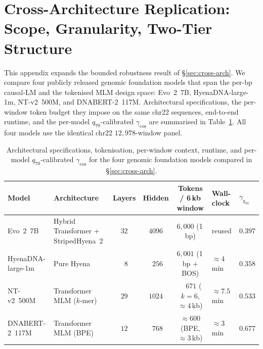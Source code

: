 \documentclass{article}
\theoremstyle{plain}
\theoremstyle{definition}
\theoremstyle{remark}
\begin{document}
\section{Cross-Architecture Replication: Scope, Granularity, Two-Tier Structure}
\label{app:cross-arch}

This appendix expands the bounded robustness result of
\S\ref{sec:cross-arch}. We compare four publicly released genomic
foundation models that span the per-bp causal-LM and the tokenised MLM
design space: Evo~2~7B, HyenaDNA-large-1m, NT-v2~500M, and
DNABERT-2~117M. Architectural specifications, the per-window token budget
they impose on the same chr22 sequences, end-to-end runtime, and the
per-model $q_{70}$-calibrated $\gamma_{\cos}$ are summarised in
Table~\ref{tab:fm-specs}. All four models use the identical chr22
$12{,}978$-window panel.

\begin{table}[!htbp]
  \caption{Architectural specifications, tokenisation, per-window context,
    runtime, and per-model $q_{70}$-calibrated $\gamma_{\cos}$ for the four
  genomic foundation models compared in \S\ref{sec:cross-arch}.}
  \label{tab:fm-specs}
  \centering
  \footnotesize
  \setlength{\tabcolsep}{4pt}
  \begin{tabular}{@{}llcccll@{}}
    \toprule
    Model & Architecture & Layers & Hidden & Tokens / 6\,kb window
    & Wall-clock & $\gamma_{q_{70}}$ \\
    \midrule
    Evo~2~7B          & Hybrid Transformer + StripedHyena~2 & $32$ & $4096$
    & $6{,}000$ (1\,bp)         & reused      & $0.397$ \\
    HyenaDNA-large-1m & Pure Hyena                          & $\phantom{0}8$ & $\phantom{0}256$
    & $6{,}001$ (1\,bp + BOS)   & $\approx 4$\,min    & $0.358$ \\
    NT-v2~500M        & Transformer MLM ($k$-mer)           & $29$ & $1024$
    & $\phantom{0,}671$ ($k=6$, $\approx 4$\,kb) & $\approx 7.5$\,min  & $0.533$ \\
    DNABERT-2~117M    & Transformer MLM (BPE)               & $12$ & $\phantom{0}768$
    & $\approx 600$ (BPE, $\approx 3$\,kb)        & $\approx 3$\,min    & $0.677$ \\
    \bottomrule
  \end{tabular}
\end{table}
\end{document}

